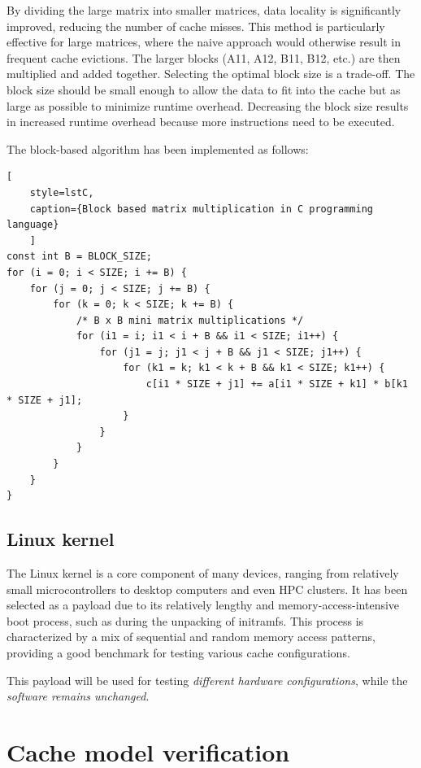 \noindent By dividing the large matrix into smaller matrices, data locality is significantly improved, reducing the number of cache misses. This method is particularly effective for
large matrices, where the naive approach would otherwise result in frequent cache evictions. The larger blocks (A11, A12, B11, B12, etc.) are then multiplied and added together.
Selecting the optimal block size is a trade-off. The block size should be small enough to allow the data to fit into the cache but as large as possible to minimize runtime
overhead. Decreasing the block size results in increased runtime overhead because more instructions need to be executed.

\noindent The block-based algorithm has been implemented as follows:
\begin{center}
\centering
\begin{minipage}{\linewidth}
\begin{lstlisting}[
	style=lstC,
    caption={Block based matrix multiplication in C programming language}
    ]
const int B = BLOCK_SIZE;
for (i = 0; i < SIZE; i += B) {
	for (j = 0; j < SIZE; j += B) {
		for (k = 0; k < SIZE; k += B) {
			/* B x B mini matrix multiplications */
			for (i1 = i; i1 < i + B && i1 < SIZE; i1++) {
				for (j1 = j; j1 < j + B && j1 < SIZE; j1++) {
					for (k1 = k; k1 < k + B && k1 < SIZE; k1++) {
						c[i1 * SIZE + j1] += a[i1 * SIZE + k1] * b[k1 * SIZE + j1];
					}
				}
			}
		}
	}
}
\end{lstlisting}
\end{minipage}
\end{center}

\subsection{Linux kernel}
The Linux kernel is a core component of many devices, ranging from relatively small microcontrollers to desktop computers and even HPC clusters.
It has been selected as a payload due to its relatively lengthy and memory-access-intensive boot process, such as during the unpacking of initramfs. This process is
characterized by a mix of sequential and random memory access patterns, providing a good benchmark for testing various cache configurations.

\noindent This payload will be used for testing \textit{different hardware configurations}, while the \textit{software remains unchanged}.

\section{Cache model verification}

